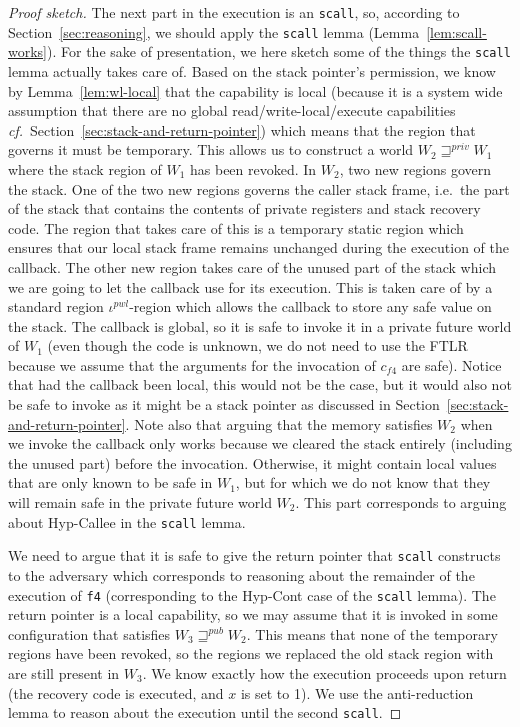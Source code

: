 \documentclass[format=acmsmall, review=true, screen=true]{acmart}
\renewcommand{\sectionname}{Section}
\newcommand{\var}[1]{\mathit{#1}}
\newcommand{\futurewk}{\mathbin{\sqsupseteq}^{\var{pub}}}
\newcommand{\futurestr}{\mathbin{\sqsupseteq}^{\var{priv}}}
\newenvironment{toplas}{}{}
\begin{document}
\begin{toplas}
\begin{proof}[Proof sketch]
  The next part in the execution is an \texttt{scall}, so, according to \sectionname~\ref{sec:reasoning}, we should apply the \texttt{scall} lemma (Lemma~\ref{lem:scall-works}).
  For the sake of presentation, we here sketch some of the things the \texttt{scall} lemma actually takes care of.
  Based on the stack pointer's permission, we know by Lemma~\ref{lem:wl-local} that the capability is local (because it is a system wide assumption that there are no global read/write-local/execute capabilities \textit{cf.}\ \sectionname~\ref{sec:stack-and-return-pointer}) which means that the region that governs it must be temporary.
  This allows us to construct a world $W_2 \futurestr W_1$ where the stack region of $W_1$ has been revoked.
  In $W_2$, two new regions govern the stack.
  One of the two new regions governs the caller stack frame, i.e.\ the part of the stack that contains the contents of private registers and stack recovery code.
  The region that takes care of this is a temporary static region which ensures that our local stack frame remains unchanged during the execution of the callback.
  The other new region takes care of the unused part of the stack which we are going to let the callback use for its execution.
  This is taken care of by a standard region $\iota^{pwl}$-region which allows the callback to store any safe value on the stack.
  The callback is global, so it is safe to invoke it in a private future world of $W_1$ (even though the code is unknown, we do not need to use the FTLR because we assume that the arguments for the invocation of $c_{f4}$ are safe).
  Notice that had the callback been local, this would not be the case, but it would also not be safe to invoke as it might be a stack pointer as discussed in \sectionname~\ref{sec:stack-and-return-pointer}.
  Note also that arguing that the memory satisfies $W_2$ when we invoke the callback only works because we cleared the stack entirely (including the unused part) before the invocation.
  Otherwise, it might contain local values that are only known to be safe in $W_1$, but for which we do not know that they will remain safe in the private future world $W_2$.
  This part corresponds to arguing about Hyp-Callee in the \texttt{scall} lemma.

  We need to argue that it is safe to give the return pointer that \texttt{scall} constructs to the adversary which corresponds to reasoning about the remainder of the execution of \texttt{f4} (corresponding to the Hyp-Cont case of the \texttt{scall} lemma).
  The return pointer is a local capability, so we may assume that it is invoked in some configuration that satisfies $W_3 \futurewk W_2$.
  This means that none of the temporary regions have been revoked, so the regions we replaced the old stack region with are still present in $W_3$.
  We know exactly how the execution proceeds upon return (the recovery code is executed, and $x$ is set to 1).
  We use the anti-reduction lemma to reason about the execution until the second \texttt{scall}.
  

\end{proof}
\end{toplas}
\end{document}
